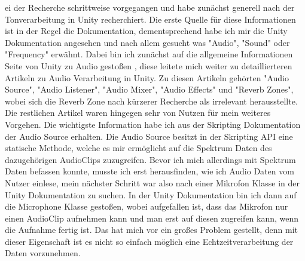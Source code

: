 ei der Recherche schrittweise vorgegangen und habe zunächst generell nach der Tonverarbeitung in Unity recherchiert. Die erste Quelle für diese Informationen ist in der Regel die Dokumentation, dementsprechend habe ich mir
die Unity Dokumentation angesehen und nach allem gesucht was "Audio", "Sound" oder "Frequency" erwähnt. Dabei bin ich zunächst auf die allgemeine Informationen Seite von Unity zu Audio gestoßen \cite{unity_doku_audio}, diese leitete mich weiter zu detaillierteren Artikeln zu Audio Verarbeitung in Unity.
Zu diesen Artikeln gehörten "Audio Source", "Audio Listener", "Audio Mixer", "Audio Effects" und "Reverb Zones", wobei sich die Reverb Zone nach kürzerer
Recherche als irrelevant herausstellte. Die restlichen Artikel waren hingegen sehr von Nutzen für mein weiteres Vorgehen. Die wichtigste Information habe ich aus der Skripting Dokumentation der Audio Source erhalten. Die Audio Source besitzt
in der Skripting API eine statische Methode, welche es mir ermöglicht auf die Spektrum Daten des dazugehörigen AudioClips zuzugreifen. Bevor ich mich allerdings
mit Spektrum Daten befassen konnte, musste ich erst herausfinden, wie ich Audio Daten vom Nutzer einlese, mein nächster Schritt war also nach einer Mikrofon Klasse in der Unity Dokumentation zu suchen.
In der Unity Dokumentation bin ich dann auf die Microphone Klasse gestoßen, wobei aufgefallen ist, dass das Mikrofon nur einen AudioClip aufnehmen kann und man erst auf diesen zugreifen kann, wenn die Aufnahme 
fertig ist. Das hat mich vor ein großes Problem gestellt, denn mit dieser Eigenschaft ist es nicht so einfach möglich eine Echtzeitverarbeitung der Daten vorzunehmen. 

